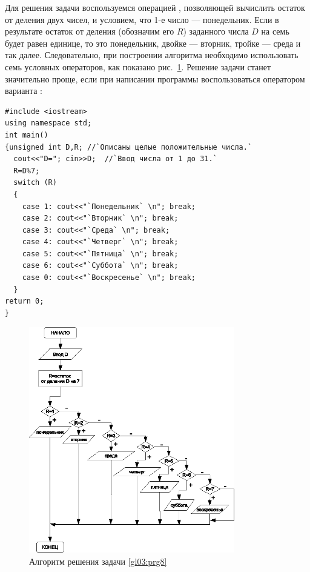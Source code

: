 Для решения задачи воспользуемся операцией \Sys{\%}, позволяющей вычислить остаток от деления двух чисел,
и условием, что 1-е число --- понедельник. Если в результате остаток от деления (обозначим его $R$)
заданного числа $D$ на семь будет равен единице, то это понедельник, двойке --- вторник, тройке --- среда
и так далее. Следовательно, при построении алгоритма необходимо использовать семь условных операторов, как показано
рис.~\ref{ch03:refDrawing20}. Решение задачи станет значительно проще, если при написании 
программы воспользоваться оператором
варианта :
\begin{lstlisting}
#include <iostream>
using namespace std;
int main()
{unsigned int D,R; //`Описаны целые положительные числа.`
  cout<<"D="; cin>>D;  //`Ввод числа от 1 до 31.`
  R=D%7;
  switch (R)
  {
    case 1: cout<<"`Понедельник` \n"; break;
    case 2: cout<<"`Вторник` \n"; break;
    case 3: cout<<"`Среда` \n"; break;
    case 4: cout<<"`Четверг` \n"; break;
    case 5: cout<<"`Пятница` \n"; break;
    case 6: cout<<"`Суббота` \n"; break;
    case 0: cout<<"`Воскресенье` \n"; break;
  }
return 0;
}
\end{lstlisting}
\begin{figure}[htb]
\begin{center}
\includegraphics[width=0.8\textwidth]{img/ris_3_21}
\caption{Алгоритм решения задачи \ref{gl03:prg8}}
\label{ch03:refDrawing20}
\end{center}
\end{figure}

